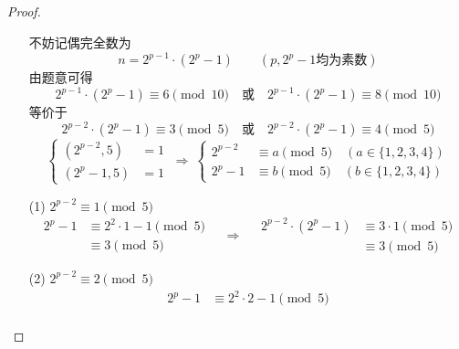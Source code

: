 \documentclass[UTF8]{ctexart}
\begin{document}
\subsection{}   %
\begin{proof}
    \begin{enumerate}
        \item []
        \item []不妨记偶完全数为
        \[
            n =2^{p-1}\cdot (2^p - 1)    
            \qquad
            (p,2^{p}-1 \mbox{均为素数})
        \]
        由题意可得
        \[
            2^{p-1}\cdot (2^p - 1) \equiv 6 \pmod{10}
            \quad
            \mbox{或}    
            \quad
            2^{p-1}\cdot (2^p - 1) \equiv 8 \pmod{10}
        \]
        等价于
        \[
            2^{p-2}\cdot (2^p - 1) \equiv 3 \pmod{5}
            \quad
            \mbox{或}    
            \quad
            2^{p-2}\cdot (2^p - 1) \equiv 4 \pmod{5}
        \]
        \[
            \begin{cases}
                (2^{p-2} , 5)  &= 1\\
                (2^{p} -1 , 5) &=1
            \end{cases}
            \ \Rightarrow\ 
            \begin{cases}
                2^{p-2} & \equiv a \pmod{5} \quad(a\in \{1,2,3,4\})\\
                2^{p}-1 & \equiv b \pmod{5} \quad(b\in \{1,2,3,4\})
            \end{cases}
        \]
        \item [(1)]$2^{p-2}\equiv 1 \pmod{5}$
        \[
            \begin{aligned}
                2^{p} - 1 
                & \equiv  
                2^2\cdot 1  - 1 \pmod{5}\\
                & \equiv
                3 \pmod{5} 
            \end{aligned}
            \quad \Rightarrow\quad 
            \begin{aligned}
                2^{p-2}\cdot (2^p - 1) 
                & \equiv
                3\cdot 1 \pmod{5}\\
                & \equiv
                3 \pmod{5}
            \end{aligned}
        \]
        \item [(2)]$2^{p-2}\equiv 2 \pmod{5}$
        \[
            \begin{aligned}
                2^{p} - 1 
                & \equiv  
                2^2\cdot 2  - 1 \pmod{5}\\

\end{aligned}\]
\end{enumerate}
\end{proof}
\end{document}
